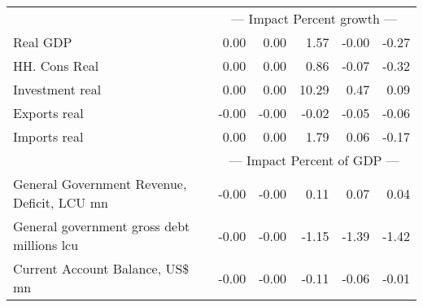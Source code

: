 \documentclass{article}
\begin{document}
\begin{table}[ht]
\begin{tabular}{lrrrrr}
&\multicolumn{5}{c}{{--- Impact Percent growth ---}}                          \\
Real GDP & 0.00 & 0.00 & 1.57 & -0.00 & -0.27 \\
HH. Cons Real & 0.00 & 0.00 & 0.86 & -0.07 & -0.32 \\
Investment real & 0.00 & 0.00 & 10.29 & 0.47 & 0.09 \\
Exports real & -0.00 & -0.00 & -0.02 & -0.05 & -0.06 \\
Imports real & 0.00 & 0.00 & 1.79 & 0.06 & -0.17 \\
&\multicolumn{5}{c}{{--- Impact Percent of GDP ---}}                          \\
General Government Revenue, Deficit, LCU mn & -0.00 & -0.00 & 0.11 & 0.07 & 0.04 \\
General government gross debt millions lcu & -0.00 & -0.00 & -1.15 & -1.39 & -1.42 \\
Current Account Balance, US\$ mn & -0.00 & -0.00 & -0.11 & -0.06 & -0.01 \\
\bottomrule
\end{tabular}
\end{table}
\end{document}
